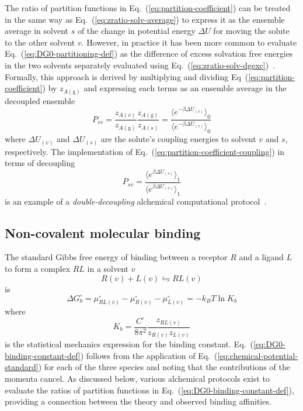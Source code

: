 \documentclass[9pt,bestpractices]{livecoms}
\begin{document}
The ratio of partition functions in Eq.~(\ref{eq:partition-coefficient}) can be treated in the same way as Eq.~(\ref{eq:zratio-solv-average}) to express it as the ensemble average in solvent $s$ of the change in potential energy $\Delta U$ for moving the solute to the other solvent $v$. However, in practice it has been more common to evaluate Eq.~(\ref{eq:DG0-partitioning-def}) as the difference of excess solvation free energies in the two solvents separately evaluated using Eq.~(\ref{eq:zratio-solv-dgexc})~\cite{bosisio2016blinded}. Formally, this approach is derived by multiplying and dividing Eq~(\ref{eq:partition-coefficient}) by $z_{A(\mathrm{g})}$ and expressing each terms as an ensemble average in the decoupled ensemble
\begin{equation}
  P_{sv} = \frac{z_{A(v)}}{z_{A(\mathrm{g})}}  \frac{z_{A(\mathrm{g})}}{z_{A(s)}} = \frac{\langle e^{-\beta \Delta U_{(v)}} \rangle_0}{\langle e^{-\beta \Delta U_{(s)} } \rangle_0 }
  \label{eq:partition-coefficient-coupling}
\end{equation}
where $\Delta U_{(v)}$ and $\Delta U_{(s)}$ are the solute's coupling energies to solvent $v$ and $s$, respectively. 
The implementation of Eq.~(\ref{eq:partition-coefficient-coupling}) in terms of decoupling
\begin{equation}
P_{sv} = \frac{\langle e^{\beta \Delta U_{(s)}} \rangle_1}{\langle e^{\beta \Delta U_{(v)} } \rangle_1 }
\label{eq:partition-coefficient-decoupling}
\end{equation}
is an example of a \emph{double-decoupling} alchemical computational protocol~\cite{hermans1986freeenergy,gilson1997statisticalthermodynamic}.

\subsection{Non-covalent molecular binding}
\label{sec:non-covalent-molecular-binding}

The standard Gibbs free energy of binding between a receptor $R$ and a ligand $L$ to form a complex $RL$ in a solvent $v$
\begin{equation}
  R(v) + L(v)  \leftrightharpoons RL(v)
  \label{eq:binding-reaction}
\end{equation}
is
\begin{equation}
  \Delta G^\circ_{b} = \mu^\circ_{RL(v)}  - \mu^\circ_{R(v)} - \mu^\circ_{L(v)} = -k_B T \ln K_b 
  \label{eq:DG0-binding-def}
\end{equation}
where~\cite{gilson1997statisticalthermodynamic,gilson2007calculation}
\begin{equation}
  K_b = \frac{C^\circ}{8 \pi^2} \frac{z_{RL(v)}}{z_{R(v)} z_{L(v)}}
  \label{eq:DG0-binding-constant-def}
\end{equation}
is the statistical mechanics expression for the binding constant. Eq.~(\ref{eq:DG0-binding-constant-def}) follows from the application of  Eq.~(\ref{eq:chemical-potential-standard}) for each of the three species and noting that the contributions of the momenta cancel. As discussed below, various alchemical protocols exist to evaluate the ratios of partition functions in Eq.~(\ref{eq:DG0-binding-constant-def}), providing a connection between the theory and observed binding affinities.
\end{document}
